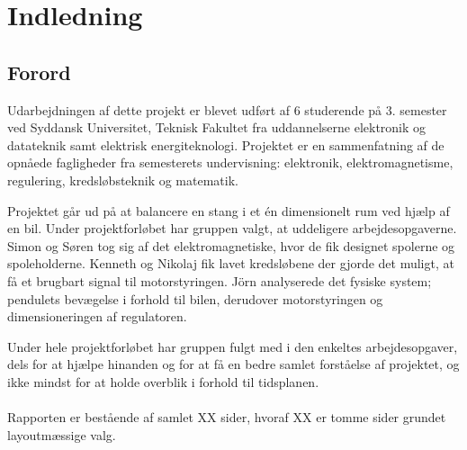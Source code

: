 \chapter{Indledning}

\section{Forord}\label{sec:forord}
Udarbejdningen af dette projekt er blevet udført af 6 studerende på 3. semester ved Syddansk Universitet, Teknisk Fakultet fra uddannelserne elektronik og datateknik samt elektrisk energiteknologi.
Projektet er en sammenfatning af de opnåede fagligheder fra semesterets undervisning: elektronik, elektromagnetisme, regulering, kredsløbsteknik og matematik.

Projektet går ud på at balancere en stang i et én dimensionelt rum ved hjælp af en bil. Under projektforløbet har gruppen valgt, at uddeligere arbejdesopgaverne. Simon og Søren tog sig af det elektromagnetiske, hvor de fik designet spolerne og spoleholderne. Kenneth og Nikolaj fik lavet kredsløbene der gjorde det muligt, at få et brugbart signal til motorstyringen. Jörn analyserede det fysiske system; pendulets bevægelse i forhold til bilen, derudover motorstyringen og dimensioneringen af regulatoren.

Under hele projektforløbet har gruppen fulgt med i den enkeltes arbejdesopgaver, dels for at hjælpe hinanden og for at få en bedre samlet forståelse af projektet, og ikke mindst for at holde overblik i forhold til tidsplanen. 
\\ \\
Rapporten er bestående af samlet XX sider, hvoraf XX er tomme sider grundet layoutmæssige valg. 